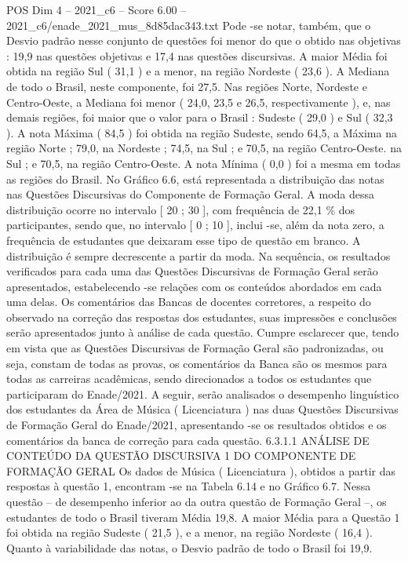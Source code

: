 \begin{textsample}{POS Dim 4 – 2021\_c6 – Score 6.00 – 2021\_c6/enade\_2021\_mus\_8d85dac343.txt}
Pode -se notar, também, que o Desvio padrão nesse conjunto de questões foi menor do que o obtido nas objetivas : 19,9 nas questões objetivas e 17,4 nas questões discursivas.
A maior Média foi obtida na região Sul ( 31,1 ) e a menor, na região Nordeste ( 23,6 ).
A Mediana de todo o Brasil, neste componente, foi 27,5.
Nas regiões Norte, Nordeste e Centro-Oeste, a Mediana foi menor ( 24,0, 23,5 e 26,5, respectivamente ), e, nas demais regiões, foi maior que o valor para o Brasil : Sudeste ( 29,0 ) e Sul ( 32,3 ).
A nota Máxima ( 84,5 ) foi obtida na região Sudeste, sendo 64,5, a Máxima na região Norte ; 79,0, na Nordeste ; 74,5, na Sul ; e 70,5, na região Centro-Oeste. na Sul ; e 70,5, na região Centro-Oeste.
A nota Mínima ( 0,0 ) foi a mesma em todas as regiões do Brasil.
No Gráfico 6.6, está representada a distribuição das notas nas Questões Discursivas do Componente de Formação Geral.
A moda dessa distribuição ocorre no intervalo [ 20 ; 30 ], com frequência de 22,1 \% dos participantes, sendo que, no intervalo [ 0 ; 10 ], inclui -se, além da nota zero, a frequência de estudantes que deixaram esse tipo de questão em branco.
A distribuição é sempre decrescente a partir da moda.
Na sequência, os resultados verificados para cada uma das Questões Discursivas de Formação Geral serão apresentados, estabelecendo -se relações com os conteúdos abordados em cada uma delas.
Os comentários das Bancas de docentes corretores, a respeito do observado na correção das respostas dos estudantes, suas impressões e conclusões serão apresentados junto à análise de cada questão.
Cumpre esclarecer que, tendo em vista que as Questões Discursivas de Formação Geral são padronizadas, ou seja, constam de todas as provas, os comentários da Banca são os mesmos para todas as carreiras acadêmicas, sendo direcionados a todos os estudantes que participaram do Enade/2021.
A seguir, serão analisados o desempenho linguístico dos estudantes da Área de Música ( Licenciatura ) nas duas Questões Discursivas de Formação Geral do Enade/2021, apresentando -se os resultados obtidos e os comentários da banca de correção para cada questão. 6.3.1.1 ANÁLISE DE CONTEÚDO DA QUESTÃO DISCURSIVA 1 DO COMPONENTE DE FORMAÇÃO GERAL Os dados de Música ( Licenciatura ), obtidos a partir das respostas à questão 1, encontram -se na Tabela 6.14 e no Gráfico 6.7.
Nessa questão – de desempenho inferior ao da outra questão de Formação Geral –, os estudantes de todo o Brasil tiveram Média 19,8.
A maior Média para a Questão 1 foi obtida na região Sudeste ( 21,5 ), e a menor, na região Nordeste ( 16,4 ).
Quanto à variabilidade das notas, o Desvio padrão de todo o Brasil foi 19,9.

\end{textsample}
